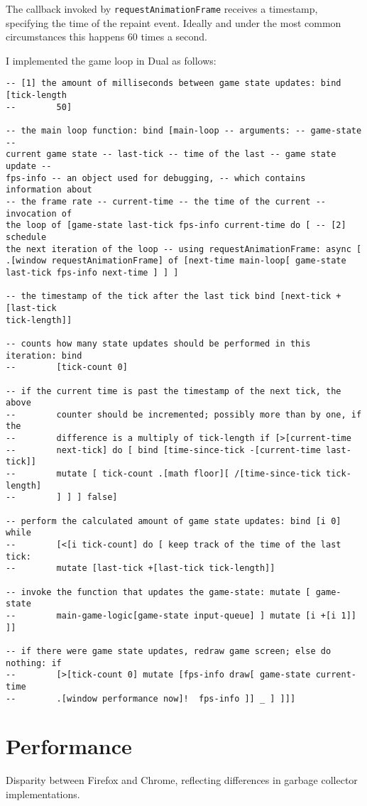 The callback invoked by \texttt{requestAnimationFrame} receives a timestamp,
specifying the time of the repaint event. Ideally and under the most common
circumstances this happens 60 times a second.

I implemented the game loop in Dual as follows:
\begin{lstlisting}
-- [1] the amount of milliseconds between game state updates: bind [tick-length
--        50]

-- the main loop function: bind [main-loop -- arguments: -- game-state --
current game state -- last-tick -- time of the last -- game state update --
fps-info -- an object used for debugging, -- which contains information about
-- the frame rate -- current-time -- the time of the current -- invocation of
the loop of [game-state last-tick fps-info current-time do [ -- [2] schedule
the next iteration of the loop -- using requestAnimationFrame: async [
.[window requestAnimationFrame] of [next-time main-loop[ game-state
last-tick fps-info next-time ] ] ]

-- the timestamp of the tick after the last tick bind [next-tick +[last-tick
tick-length]]

-- counts how many state updates should be performed in this iteration: bind
--        [tick-count 0]

-- if the current time is past the timestamp of the next tick, the above
--        counter should be incremented; possibly more than by one, if the
--        difference is a multiply of tick-length if [>[current-time
--        next-tick] do [ bind [time-since-tick -[current-time last-tick]]
--        mutate [ tick-count .[math floor][ /[time-since-tick tick-length]
--        ] ] ] false]

-- perform the calculated amount of game state updates: bind [i 0] while
--        [<[i tick-count] do [ keep track of the time of the last tick:
--        mutate [last-tick +[last-tick tick-length]]

-- invoke the function that updates the game-state: mutate [ game-state
--        main-game-logic[game-state input-queue] ] mutate [i +[i 1]] ]]

-- if there were game state updates, redraw game screen; else do nothing: if
--        [>[tick-count 0] mutate [fps-info draw[ game-state current-time
--        .[window performance now]!  fps-info ]] _ ] ]]]
\end{lstlisting}


\section{Performance}
Disparity between Firefox and Chrome, reflecting differences in garbage
collector implementations.

